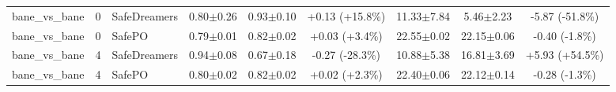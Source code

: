 \documentclass{article}
\begin{document}
\begin{longtable}{lclcccccc}
\midrule
bane\_vs\_bane & 0 & SafeDreamers & 0.80$\pm$0.26 & 0.93$\pm$0.10 & \textcolor{green!70!black}{+0.13 (+15.8\%)} & 11.33$\pm$7.84 & 5.46$\pm$2.23 & \textcolor{green!100!black}{-5.87 (-51.8\%)} \\
bane\_vs\_bane & 0 & SafePO & 0.79$\pm$0.01 & 0.82$\pm$0.02 & \textcolor{green!40!black}{+0.03 (+3.4\%)} & 22.55$\pm$0.02 & 22.15$\pm$0.06 & \textcolor{green!40!black}{-0.40 (-1.8\%)} \\
bane\_vs\_bane & 4 & SafeDreamers & 0.94$\pm$0.08 & 0.67$\pm$0.18 & \textcolor{red!70!black}{-0.27 (-28.3\%)} & 10.88$\pm$5.38 & 16.81$\pm$3.69 & \textcolor{red!100!black}{+5.93 (+54.5\%)} \\
bane\_vs\_bane & 4 & SafePO & 0.80$\pm$0.02 & 0.82$\pm$0.02 & \textcolor{green!40!black}{+0.02 (+2.3\%)} & 22.40$\pm$0.06 & 22.12$\pm$0.14 & \textcolor{green!40!black}{-0.28 (-1.3\%)} \\
\midrule
\bottomrule
\end{longtable}
\end{document}
